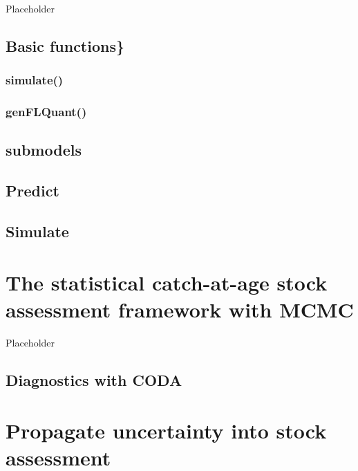 \documentclass[
]{book}
\begin{document}
Placeholder

\hypertarget{basic-functions}{%
\section{Basic functions\}}\label{basic-functions}}

\hypertarget{simulate}{%
\subsection{simulate()}\label{simulate}}

\hypertarget{genflquant}{%
\subsection{genFLQuant()}\label{genflquant}}

\hypertarget{submodels}{%
\section{submodels}\label{submodels}}

\hypertarget{predict}{%
\section{Predict}\label{predict}}

\hypertarget{simulate-1}{%
\section{Simulate}\label{simulate-1}}

\hypertarget{the-statistical-catch-at-age-stock-assessment-framework-with-mcmc}{%
\chapter{\texorpdfstring{The statistical catch-at-age stock assessment framework with MCMC \label{sec:mcmc}}{The statistical catch-at-age stock assessment framework with MCMC }}\label{the-statistical-catch-at-age-stock-assessment-framework-with-mcmc}}

Placeholder

\hypertarget{diagnostics-with-coda}{%
\section{Diagnostics with CODA}\label{diagnostics-with-coda}}

\hypertarget{propagate-uncertainty-into-stock-assessment}{%
\chapter{Propagate uncertainty into stock assessment}\label{propagate-uncertainty-into-stock-assessment}}
\end{document}
